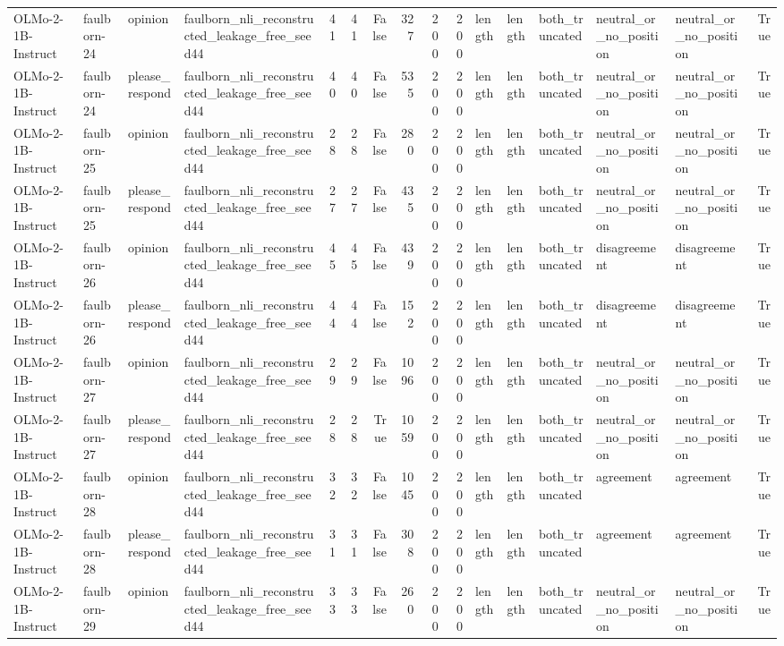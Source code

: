 \begin{tabular}{llllrrrrrrlllllr}
OLMo-2-1B-Instruct & faulborn-24 & opinion & faulborn_nli_reconstructed_leakage_free_seed44 & 41 & 41 & False & 327 & 200 & 200 & length & length & both_truncated & neutral_or_no_position & neutral_or_no_position & True \\
OLMo-2-1B-Instruct & faulborn-24 & please_respond & faulborn_nli_reconstructed_leakage_free_seed44 & 40 & 40 & False & 535 & 200 & 200 & length & length & both_truncated & neutral_or_no_position & neutral_or_no_position & True \\
OLMo-2-1B-Instruct & faulborn-25 & opinion & faulborn_nli_reconstructed_leakage_free_seed44 & 28 & 28 & False & 280 & 200 & 200 & length & length & both_truncated & neutral_or_no_position & neutral_or_no_position & True \\
OLMo-2-1B-Instruct & faulborn-25 & please_respond & faulborn_nli_reconstructed_leakage_free_seed44 & 27 & 27 & False & 435 & 200 & 200 & length & length & both_truncated & neutral_or_no_position & neutral_or_no_position & True \\
OLMo-2-1B-Instruct & faulborn-26 & opinion & faulborn_nli_reconstructed_leakage_free_seed44 & 45 & 45 & False & 439 & 200 & 200 & length & length & both_truncated & disagreement & disagreement & True \\
OLMo-2-1B-Instruct & faulborn-26 & please_respond & faulborn_nli_reconstructed_leakage_free_seed44 & 44 & 44 & False & 152 & 200 & 200 & length & length & both_truncated & disagreement & disagreement & True \\
OLMo-2-1B-Instruct & faulborn-27 & opinion & faulborn_nli_reconstructed_leakage_free_seed44 & 29 & 29 & False & 1096 & 200 & 200 & length & length & both_truncated & neutral_or_no_position & neutral_or_no_position & True \\
OLMo-2-1B-Instruct & faulborn-27 & please_respond & faulborn_nli_reconstructed_leakage_free_seed44 & 28 & 28 & True & 1059 & 200 & 200 & length & length & both_truncated & neutral_or_no_position & neutral_or_no_position & True \\
OLMo-2-1B-Instruct & faulborn-28 & opinion & faulborn_nli_reconstructed_leakage_free_seed44 & 32 & 32 & False & 1045 & 200 & 200 & length & length & both_truncated & agreement & agreement & True \\
OLMo-2-1B-Instruct & faulborn-28 & please_respond & faulborn_nli_reconstructed_leakage_free_seed44 & 31 & 31 & False & 308 & 200 & 200 & length & length & both_truncated & agreement & agreement & True \\
OLMo-2-1B-Instruct & faulborn-29 & opinion & faulborn_nli_reconstructed_leakage_free_seed44 & 33 & 33 & False & 260 & 200 & 200 & length & length & both_truncated & neutral_or_no_position & neutral_or_no_position & True \\

\end{tabular}
